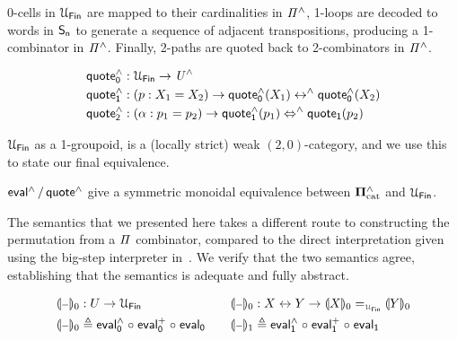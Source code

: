 0-cells in $\UFin$ are mapped to their cardinalities in $\mathit{{\Pi}^{\wedge}}$, 1-loops are decoded to words in $\Sn$ to generate
a sequence of adjacent transpositions, producing a 1-combinator in $\mathit{{\Pi}^{\wedge}}$. Finally, 2-paths are quoted back to
2-combinators in $\mathit{{\Pi}^{\wedge}}$.

\begin{definition}[$\quoteh$]
  \begin{align*}
    \quoteh_{0} & : \UFin \to \UHat                                                            \\
    \quoteh_{1} & : (p : X_{1} \id X_{2}) \to \quoteh_{0}(X_{1}) \isoh \quoteh_{0}(X_{2})      \\
    \quoteh_{2} & : (\alpha : p_{1} \id p_{2}) \to \quoteh_{1}(p_{1}) \Isoh \quotet_{1}(p_{2})
  \end{align*}
\end{definition}

$\UFin$ as a 1-groupoid, is a (locally strict) weak $(2,0)$-category, and we use this to state our final equivalence.

\begin{theorem}
  $\evalh/\quoteh$ give a symmetric monoidal equivalence between $\mathbf{\Pi}^{\wedge}_{\mathrm{cat}}$ and $\UFin$.
\end{theorem}

The semantics that we presented here takes a different route to constructing the permutation from a $\mathit{\Pi}$
combinator, compared to the direct interpretation given using the big-step interpreter in~. We
verify that the two semantics agree, establishing that the semantics is adequate and fully abstract.

\begin{definition}[${\gdenot{\blank}}$]
  \begin{gather*}
    \begin{aligned}
      \gdenot{\blank}_{0} & : U \to \UFin                                       \\
      \gdenot{\blank}_{0} & \defeq \evalh_{0} \comp \evalp_{0} \comp \evalt_{0}
    \end{aligned}
    \qquad
    \begin{aligned}
      \gdenot{\blank}_{0} & : X \iso Y \to \gdenot{X}_{0} \id_{\UFin} \gdenot{Y}_{0} \\
      \gdenot{\blank}_{1} & \defeq \evalh_{1} \comp \evalp_{1} \comp \evalt_{1}
    \end{aligned}
  \end{gather*}
\end{definition}

